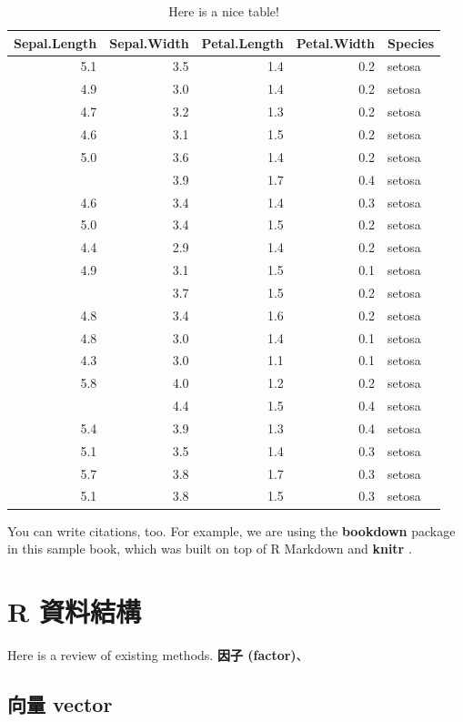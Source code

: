 \documentclass[]{book}
\theoremstyle{definition}
\theoremstyle{definition}
\theoremstyle{remark}
\begin{document}
\begin{table}

\caption{\label{tab:nice-tab}Here is a nice table!}
\centering
\begin{tabular}[t]{rrrrl}
\toprule
Sepal.Length & Sepal.Width & Petal.Length & Petal.Width & Species\\
\midrule
5.1 & 3.5 & 1.4 & 0.2 & setosa\\
4.9 & 3.0 & 1.4 & 0.2 & setosa\\
4.7 & 3.2 & 1.3 & 0.2 & setosa\\
4.6 & 3.1 & 1.5 & 0.2 & setosa\\
5.0 & 3.6 & 1.4 & 0.2 & setosa\\
\addlinespace
5.4 & 3.9 & 1.7 & 0.4 & setosa\\
4.6 & 3.4 & 1.4 & 0.3 & setosa\\
5.0 & 3.4 & 1.5 & 0.2 & setosa\\
4.4 & 2.9 & 1.4 & 0.2 & setosa\\
4.9 & 3.1 & 1.5 & 0.1 & setosa\\
\addlinespace
5.4 & 3.7 & 1.5 & 0.2 & setosa\\
4.8 & 3.4 & 1.6 & 0.2 & setosa\\
4.8 & 3.0 & 1.4 & 0.1 & setosa\\
4.3 & 3.0 & 1.1 & 0.1 & setosa\\
5.8 & 4.0 & 1.2 & 0.2 & setosa\\
\addlinespace
5.7 & 4.4 & 1.5 & 0.4 & setosa\\
5.4 & 3.9 & 1.3 & 0.4 & setosa\\
5.1 & 3.5 & 1.4 & 0.3 & setosa\\
5.7 & 3.8 & 1.7 & 0.3 & setosa\\
5.1 & 3.8 & 1.5 & 0.3 & setosa\\
\bottomrule
\end{tabular}
\end{table}

You can write citations, too. For example, we are using the
\textbf{bookdown} package \citep{R-bookdown} in this sample book, which
was built on top of R Markdown and \textbf{knitr} \citep{xie2015}.

\chapter{R 資料結構}\label{RDataStructure}

Here is a review of existing methods. \textbf{因子 (factor)}、

\section{向量 vector}\label{-vector}
\end{document}
